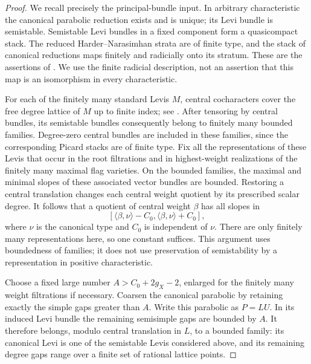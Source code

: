 \begin{proof}
We recall precisely the principal-bundle input.  In arbitrary
characteristic the canonical parabolic reduction exists and is unique;
its Levi bundle is semistable.  Semistable Levi bundles in a fixed
component form a quasicompact stack.  The reduced Harder--Narasimhan
strata are of finite type, and the stack of canonical reductions maps
finitely and radicially onto its stratum.  These are the assertions of
\cite[\S\,2.3.1, Theorem~2.3.3(a),(c), and \S\,2.4.1]{Schieder}.
We use the finite radicial description, not an assertion that this map
is an isomorphism in every characteristic.

For each of the finitely many standard Levis $M$, central cocharacters
cover the free degree lattice of $M$ up to finite index; see
\cite[\S\,2.1.3]{Schieder}.
After tensoring by central bundles, its semistable bundles consequently
belong to finitely many bounded families.  Degree-zero central bundles
are included in these families, since the corresponding Picard stacks
are of finite type.  Fix all the representations of these Levis that
occur in the root filtrations and in highest-weight realizations of
the finitely many maximal flag varieties.  On the bounded families,
the maximal and minimal slopes of these associated vector bundles
are bounded.  Restoring a central translation changes each central
weight quotient by its prescribed scalar degree.  It follows that a
quotient of central weight $\beta$ has all slopes in
\begin{equation}
\label{amp:slope-interval}
 [\langle\beta,\nu\rangle-C_0,
   \langle\beta,\nu\rangle+C_0],
\end{equation}
where $\nu$ is the canonical type and $C_0$ is independent of $\nu$.
There are only finitely many representations here, so one constant
suffices.  This argument uses boundedness of families; it does not
use preservation of semistability by a representation in positive
characteristic.

Choose a fixed large number $A>C_0+2g_X-2$, enlarged for the finitely
many weight filtrations if necessary.  Coarsen the canonical parabolic
by retaining exactly the simple gaps greater than $A$.
Write this parabolic as $P=LU$.  In its induced Levi bundle the
remaining semisimple gaps are bounded by $A$.  It therefore belongs,
modulo central translation in $L$, to a bounded family: its canonical
Levi is one of the semistable Levis considered above, and its remaining
degree gaps range over a finite set of rational lattice points.


\end{proof}
